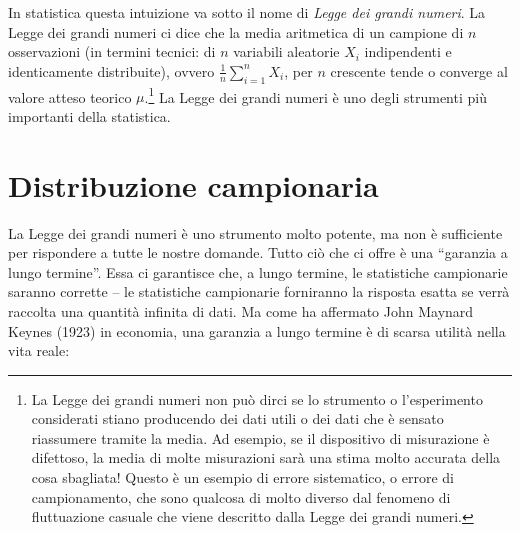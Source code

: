 \noindent
In statistica questa intuizione va sotto il nome di \emph{Legge dei grandi numeri}.
La Legge dei grandi numeri ci dice che la media aritmetica di un campione di $n$ osservazioni (in termini tecnici: di $n$ variabili aleatorie $X_i$ indipendenti e identicamente distribuite), ovvero $\frac{1}{n}\sum_{i=1}^nX_i$, per $n$ crescente tende o converge al valore atteso teorico $\mu$.\footnote{
La Legge dei grandi numeri non può dirci se lo strumento o l'esperimento considerati stiano producendo dei dati utili o dei dati che è sensato riassumere tramite la media. 
Ad esempio, se il dispositivo di misurazione è difettoso, la media di molte misurazioni sarà una stima molto accurata della cosa sbagliata! 
Questo è un esempio di errore sistematico, o errore di campionamento, che sono qualcosa di molto diverso dal fenomeno di fluttuazione casuale che viene descritto dalla Legge dei grandi numeri. 
}
%
%
La Legge dei grandi numeri è uno degli strumenti più importanti della statistica. 


\section{Distribuzione campionaria}

La Legge dei grandi numeri è uno strumento molto potente, ma non è sufficiente per rispondere a tutte le nostre domande. 
Tutto ciò che ci offre è una \enquote{garanzia a lungo termine}. 
Essa ci garantisce che, a lungo termine, le statistiche campionarie saranno corrette -- le statistiche campionarie forniranno la risposta esatta se verrà raccolta una quantità infinita di dati. 
Ma come ha affermato John Maynard Keynes (1923) in economia, una garanzia a lungo termine è di scarsa utilità nella vita reale:

